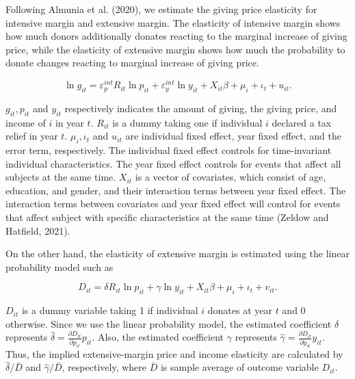 \documentclass[
  11pt,
  a4paper,
]{article}
\begin{document}
Following Almunia et al. (2020), we estimate the giving price elasticity for intensive margin and extensive margin. The elasticity of intensive margin shows how much donors additionally donates reacting to the marginal increase of giving price, while the elasticity of extensive margin shows how much the probability to donate changes reacting to marginal increase of giving price.

\begin{equation}
    \ln g_{it} = \varepsilon^{int}_p R_{it} \ln p_{it} + \varepsilon^{int}_y \ln y_{it} 
    + X_{it}\beta +\mu_i +\iota_t +u_{it}. \label{eq:intensive}
\end{equation}

\(g_{it}, p_{it}\) and \(y_{it}\) respectively indicates the amount of giving, the giving price, and income of \(i\) in year \(t\).
\(R_{it}\) is a dummy taking one if individual \(i\) declared a tax relief in year \(t\).
\(\mu_i, \iota_t\) and \(u_{it}\) are individual fixed effect, year fixed effect, and the error term, respectively.
The individual fixed effect controls for time-invariant individual characteristics. The year fixed effect controls for events that affect all subjects at the same time. \(X_{it}\) is a vector of covariates, which consist of age, education, and gender, and their interaction terms between year fixed effect. The interaction terms between covariates and year fixed effect will control for events that affect subject with specific characteristics at the same time (Zeldow and Hatfield, 2021).

On the other hand,
the elasticity of extensive margin is estimated using the linear probability model such as

\begin{equation}
D_{it} =  \delta R_{it} \ln p_{it} +\gamma \ln y_{it} + X_{it}\beta +\mu_i  +\iota_t +v_{it}. \label{eq:extensive}
\end{equation}

\(D_{it}\) is a dummy variable taking 1 if individual \(i\) donates at year \(t\) and 0 otherwise.
Since we use the linear probability model,
the estimated coefficient \(\delta\) represents \(\hat{\delta} = \frac{\partial D_{it}}{\partial p_{it}} p_{it}\).
Also, the estimated coefficient \(\gamma\) represents \(\hat{\gamma} = \frac{\partial D_{it}}{\partial y_{it}} y_{it}\).
Thus, the implied extensive-margin price and income elasticity are calculated by
\(\hat{\delta}/\bar{D}\) and \(\hat{\gamma}/\bar{D}\), respectively,
where \(\bar{D}\) is sample average of outcome variable \(D_{it}\).
\end{document}
